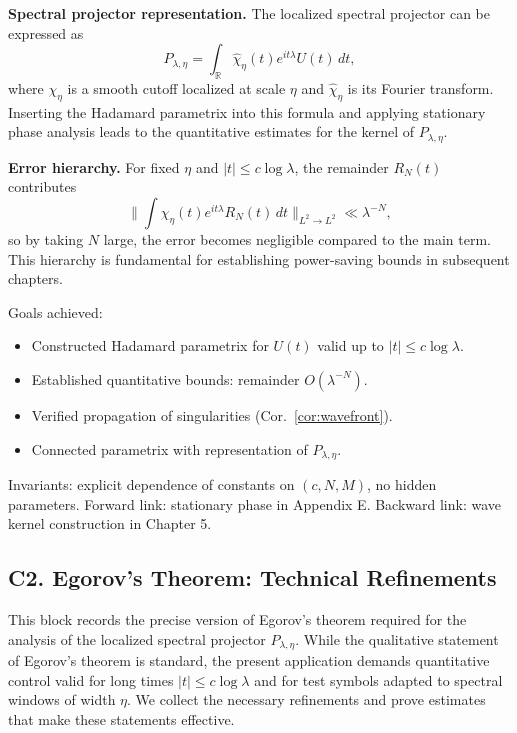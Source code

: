 \medskip

\textbf{Spectral projector representation.} The localized spectral projector can be expressed as
\[
P_{\lambda,\eta} = \int_{\mathbb{R}} \widehat{\chi}_\eta(t) e^{it\lambda} U(t)\, dt,
\]
where $\chi_\eta$ is a smooth cutoff localized at scale $\eta$ and $\widehat{\chi}_\eta$ is its Fourier transform. Inserting the Hadamard parametrix into this formula and applying stationary phase analysis leads to the quantitative estimates for the kernel of $P_{\lambda,\eta}$.

\medskip

\textbf{Error hierarchy.} For fixed $\eta$ and $|t| \le c \log \lambda$, the remainder $R_N(t)$ contributes
\[
\| \int \widehat{\chi}_\eta(t) e^{it\lambda} R_N(t)\, dt \|_{L^2 \to L^2} \ll \lambda^{-N},
\]
so by taking $N$ large, the error becomes negligible compared to the main term. This hierarchy is fundamental for establishing power-saving bounds in subsequent chapters.

\medskip

\begin{auditblock}[C1]
Goals achieved:
\begin{itemize}
  \item Constructed Hadamard parametrix for $U(t)$ valid up to $|t| \le c \log \lambda$.
  \item Established quantitative bounds: remainder $O(\lambda^{-N})$.
  \item Verified propagation of singularities (Cor.~\ref{cor:wavefront}).
  \item Connected parametrix with representation of $P_{\lambda,\eta}$.
\end{itemize}
Invariants: explicit dependence of constants on $(c,N,M)$, no hidden parameters. Forward link: stationary phase in Appendix E. Backward link: wave kernel construction in Chapter 5.
\end{auditblock}

\subsection*{C2. Egorov’s Theorem: Technical Refinements}

This block records the precise version of Egorov’s theorem required for the analysis of the localized spectral projector $P_{\lambda,\eta}$. While the qualitative statement of Egorov’s theorem is standard, the present application demands quantitative control valid for long times $|t| \leq c \log \lambda$ and for test symbols adapted to spectral windows of width $\eta$. We collect the necessary refinements and prove estimates that make these statements effective.

